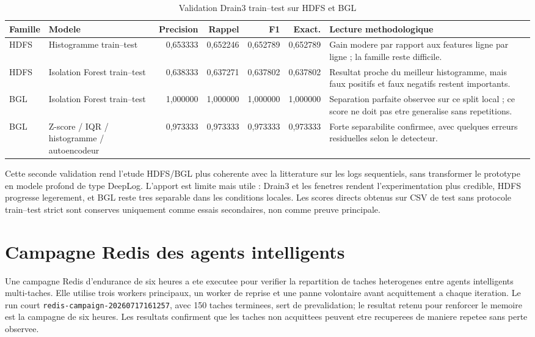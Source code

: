 \begin{table}[H]
\centering
\caption{Validation Drain3 train--test sur HDFS et BGL}
\label{tab:hdfs-bgl-drain3-train-test}
\scriptsize
\begin{tabularx}{\textwidth}{p{2.6cm}p{3.4cm}rrrrX}
\toprule
\textbf{Famille} & \textbf{Modele} & \textbf{Precision} & \textbf{Rappel} & \textbf{F1} & \textbf{Exact.} & \textbf{Lecture methodologique} \\
\midrule
HDFS & Histogramme train--test & 0,653333 & 0,652246 & 0,652789 & 0,652789 & Gain modere par rapport aux features ligne par ligne ; la famille reste difficile. \\
HDFS & Isolation Forest train--test & 0,638333 & 0,637271 & 0,637802 & 0,637802 & Resultat proche du meilleur histogramme, mais faux positifs et faux negatifs restent importants. \\
BGL & Isolation Forest train--test & 1,000000 & 1,000000 & 1,000000 & 1,000000 & Separation parfaite observee sur ce split local ; ce score ne doit pas etre generalise sans repetitions. \\
BGL & Z-score / IQR / histogramme / autoencodeur & 0,973333 & 0,973333 & 0,973333 & 0,973333 & Forte separabilite confirmee, avec quelques erreurs residuelles selon le detecteur. \\
\bottomrule
\end{tabularx}
\end{table}

Cette seconde validation rend l'etude HDFS/BGL plus coherente avec la litterature sur les logs sequentiels, sans transformer le prototype en modele profond de type DeepLog. L'apport est limite mais utile : Drain3 et les fenetres rendent l'experimentation plus credible, HDFS progresse legerement, et BGL reste tres separable dans les conditions locales. Les scores directs obtenus sur CSV de test sans protocole train--test strict sont conserves uniquement comme essais secondaires, non comme preuve principale.

\section{Campagne Redis des agents intelligents}
Une campagne Redis d'endurance de six heures a ete executee pour verifier la repartition de taches heterogenes entre agents intelligents multi-taches. Elle utilise trois workers principaux, un worker de reprise et une panne volontaire avant acquittement a chaque iteration. Le run court \texttt{redis-campaign-20260717161257}, avec 150 taches terminees, sert de prevalidation; le resultat retenu pour renforcer le memoire est la campagne de six heures. Les resultats confirment que les taches non acquittees peuvent etre recuperees de maniere repetee sans perte observee.

